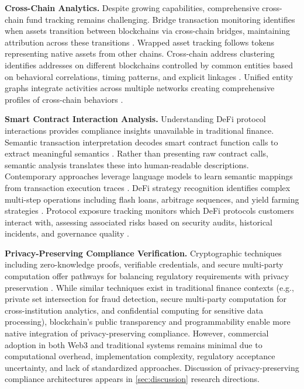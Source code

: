 \documentclass[conference,compsoc]{IEEEtran}
\begin{document}
\noindent\textbf{Cross-Chain Analytics.}
Despite growing capabilities, comprehensive cross-chain fund tracking remains challenging. Bridge transaction monitoring identifies when assets transition between blockchains via cross-chain bridges, maintaining attribution across these transitions \cite{yousaf2019tracingtransactionscryptocurrency,zamyatin2021sokcommunicationdistributed,zhang2024securitycrosschainbridges}. Wrapped asset tracking follows tokens representing native assets from other chains. Cross-chain address clustering identifies addresses on different blockchains controlled by common entities based on behavioral correlations, timing patterns, and explicit linkages \cite{lin2024crosschainabnormaltransaction}. Unified entity graphs integrate activities across multiple networks creating comprehensive profiles of cross-chain behaviors \cite{coquide2025alamedaresearchmultitoken}.

\noindent\textbf{Smart Contract Interaction Analysis.}
Understanding DeFi protocol interactions provides compliance insights unavailable in traditional finance. Semantic transaction interpretation decodes smart contract function calls to extract meaningful semantics \cite{chen2020understandingethereumgraph,victor2019measuringethereumbasederc20}. Rather than presenting raw contract calls, semantic analysis translates these into human-readable descriptions. Contemporary approaches leverage language models to learn semantic mappings from transaction execution traces \cite{sun2025ethereumfrauddetection}. DeFi strategy recognition identifies complex multi-step operations including flash loans, arbitrage sequences, and yield farming strategies \cite{qin2021attackingdefiecosystem,daian2020flashboys20}. Protocol exposure tracking monitors which DeFi protocols customers interact with, assessing associated risks based on security audits, historical incidents, and governance quality \cite{sun2024sokcomprehensiveanalysis,ling2025sokstablecoindesigns}.

\noindent\textbf{Privacy-Preserving Compliance Verification.}
Cryptographic techniques including zero-knowledge proofs, verifiable credentials, and secure multi-party computation offer pathways for balancing regulatory requirements with privacy preservation \cite{ben-sasson2017scalablezeroknowledge,reed2022decentralizedidentifiersdids,zhang2024blockchainzeroknowledge}. While similar techniques exist in traditional finance contexts (e.g., private set intersection for fraud detection, secure multi-party computation for cross-institution analytics, and confidential computing for sensitive data processing), blockchain's public transparency and programmability enable more native integration of privacy-preserving compliance. However, commercial adoption in both Web3 and traditional systems remains minimal due to computational overhead, implementation complexity, regulatory acceptance uncertainty, and lack of standardized approaches. Discussion of privacy-preserving compliance architectures appears in \autoref{sec:discussion} research directions.
\end{document}

